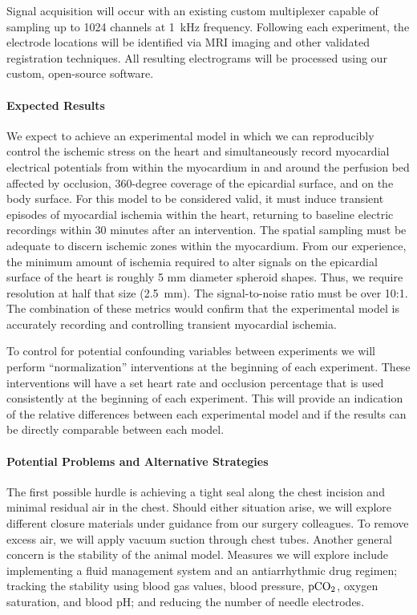 Signal acquisition will occur with an existing custom multiplexer capable
of sampling up to 1024 channels at 1~kHz frequency.   Following each experiment, the electrode locations will be
identified via MRI imaging and other validated registration
techniques.\cite{BLZ:Zen2018a} All resulting electrograms will be processed
using our custom, open-source software.\cite{RSM:Rod2018}


\paragraph{Expected Results} We expect to achieve an experimental model in
which we can reproducibly control the ischemic stress on the heart and
simultaneously record myocardial electrical potentials from within the
myocardium in and around the perfusion bed affected by
occlusion, 360-degree coverage of the epicardial surface, and on the body surface.  For this
model to be considered valid, it must induce transient episodes of
myocardial ischemia within the heart, returning to baseline electric
recordings within 30 minutes after an intervention. The spatial sampling
must be adequate to discern ischemic zones within the myocardium. From our
experience, the minimum amount of ischemia required to alter signals on the
epicardial surface of the heart is roughly 5 mm diameter spheroid
shapes. Thus, we require resolution at half that size (2.5~mm).  The signal-to-noise ratio must be over 10:1. The combination of these metrics would confirm that the experimental model is accurately recording and controlling transient myocardial ischemia.

To control for potential confounding variables between experiments we will perform ``normalization'' interventions at the beginning of each experiment. These interventions will have a set heart rate and occlusion percentage that is used consistently at the beginning of each experiment. This will provide an indication of the relative differences between each experimental model and if the results can be directly comparable between each model. 


\paragraph{Potential Problems and Alternative Strategies} The first
possible hurdle is achieving a tight seal along the chest incision and
minimal residual air in the chest.  Should either situation arise, we will
explore different closure materials under guidance from our surgery
colleagues. To remove excess air, we will apply vacuum suction through
chest tubes. Another general concern is the stability of the animal
model. Measures we will explore include implementing a fluid management
system and an antiarrhythmic drug regimen; tracking the stability using
blood gas values, blood pressure, ${\rm pCO_2}$, oxygen saturation, and
blood pH; and reducing the number of needle electrodes.


